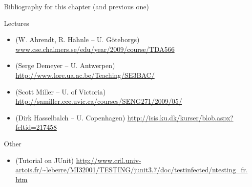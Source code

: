 \begin{frame}{Bibliography for this chapter (and previous one)}
  \begin{block}{Lectures}
    \begin{itemize}
    \item {} (W. Ahrendt,
      R. H\"ahnle -- U. G\"oteborgs)
      \url{www.cse.chalmers.se/edu/year/2009/course/TDA566}
    \item {} (Serge Demeyer -- U. Antwerpen)
      \url{http://www.lore.ua.ac.be/Teaching/SE3BAC/}
    \item {} (Scott Miller -- U. of
      Victoria)\\
      \url{http://samiller.ece.uvic.ca/courses/SENG271/2009/05/}
    \item {} (Dirk Hasselbalch -- U. Copenhagen) 
      \url{http://isis.ku.dk/kurser/blob.aspx?feltid=217458}
    \end{itemize}    
  \end{block}
  \begin{block}{Other}
    \begin{itemize}
    \item {} (Tutorial on JUnit)
      \url{http://www.cril.univ-artois.fr/~leberre/MI32001/TESTING/junit3.7/doc/testinfected/ntesting_fr.htm}
    \end{itemize}    
  \end{block}
\end{frame}
